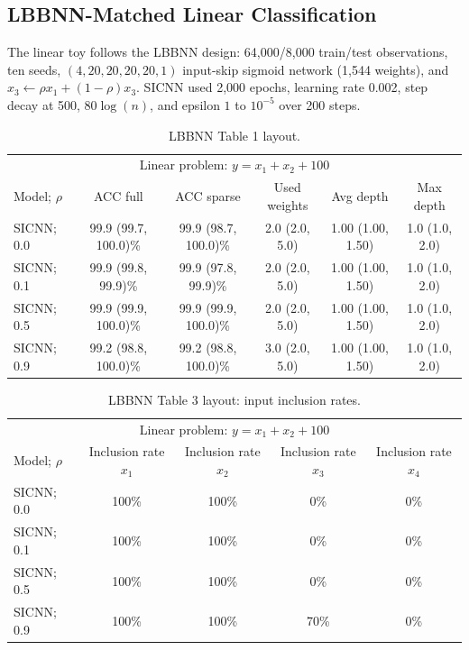 \documentclass{article}
\begin{document}
\subsection{LBBNN-Matched Linear Classification}
The linear toy follows the LBBNN design: 64,000/8,000 train/test observations, ten seeds, $(4,20,20,20,20,1)$ input-skip sigmoid network (1,544 weights), and $x_3\leftarrow\rho x_1+(1-\rho)x_3$. SICNN used 2,000 epochs, learning rate 0.002, step decay at 500, $80\log(n)$, and epsilon $1$ to $10^{-5}$ over 200 steps.
\begin{table}[t]\centering\small
\begin{tabular}{lccccc}\hline
\multicolumn{6}{c}{Linear problem: $y=x_1+x_2+100$}\\ Model; $\rho$ & ACC full & ACC sparse & Used weights & Avg depth & Max depth\\\hline
SICNN; 0.0 & 99.9 (99.7, 100.0)\% & 99.9 (98.7, 100.0)\% & 2.0 (2.0, 5.0) & 1.00 (1.00, 1.50) & 1.0 (1.0, 2.0)\\
SICNN; 0.1 & 99.9 (99.8, 99.9)\% & 99.9 (97.8, 99.9)\% & 2.0 (2.0, 5.0) & 1.00 (1.00, 1.50) & 1.0 (1.0, 2.0)\\
SICNN; 0.5 & 99.9 (99.9, 100.0)\% & 99.9 (99.9, 100.0)\% & 2.0 (2.0, 5.0) & 1.00 (1.00, 1.50) & 1.0 (1.0, 2.0)\\
SICNN; 0.9 & 99.2 (98.8, 100.0)\% & 99.2 (98.8, 100.0)\% & 3.0 (2.0, 5.0) & 1.00 (1.00, 1.50) & 1.0 (1.0, 2.0)\\\hline\end{tabular}
\caption{LBBNN Table 1 layout.}\end{table}
\begin{table}[t]\centering\small
\begin{tabular}{lcccc}\hline
\multicolumn{5}{c}{Linear problem: $y=x_1+x_2+100$}\\ Model; $\rho$ & Inclusion rate $x_1$ & Inclusion rate $x_2$ & Inclusion rate $x_3$ & Inclusion rate $x_4$\\\hline
SICNN; 0.0 & 100\% & 100\% & 0\% & 0\%\\ SICNN; 0.1 & 100\% & 100\% & 0\% & 0\%\\ SICNN; 0.5 & 100\% & 100\% & 0\% & 0\%\\ SICNN; 0.9 & 100\% & 100\% & 70\% & 0\%\\\hline\end{tabular}
\caption{LBBNN Table 3 layout: input inclusion rates.}\end{table}
\end{document}
